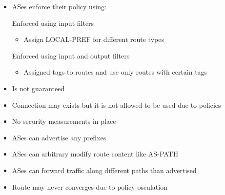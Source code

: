 \begin{itemize}
\begin{itemize}
\begin{itemize}
\begin{itemize}
                        \end{itemize}
                    \item ASes enforce their policy using:
                        \begin{itemize}
                             Enforced using input filters
                                \begin{itemize}
                                    \item Assign LOCAL-PREF for different route types
                                \end{itemize}
                             Enforced using input and output filters
                                \begin{itemize}
                                    \item Assigned tags to routes and use only routes with certain tags
                                \end{itemize}
                        \end{itemize}
                \end{itemize}
                \begin{itemize}
                        \begin{itemize}
                            \item Is not guaranteed
                            \item Connection may exists but it is not allowed to be used due to policies
                        \end{itemize}
                        \begin{itemize}
                            \item No security measurements in place
                            \item ASes can advertise any prefixes
                            \item ASes can arbitrary modify route content like AS-PATH
                            \item ASes can forward traffic along different paths than advertised
                        \end{itemize}
                        \begin{itemize}
                            \item Route may never converges due to policy osculation

\end{itemize}
\end{itemize}
\end{itemize}
\end{itemize}
